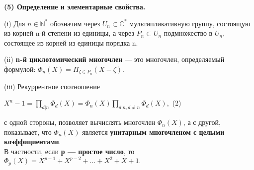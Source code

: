 \documentclass{mai_book}
\begin{document}
\textbf{(5) Определение и элементарные свойства.}

(i) Для $n \in \mathbb{N}^*$ обозначим через $U_n \subset \mathbb{C}^* $ мультипликативную 
группу,
состоящую из корней n-й степени из единицы, а через $P_n \subset U_n $
подмножество в $U_n$, состоящее из корней из единицы порядка n.

(ii) \textbf{n-й циклотомический многочлен} — это многочлен, 
определяемый формулой: $\Phi_n(X) = \Pi_{\zeta \in P_n}(X - \zeta). $

(iii) Рекуррентное соотношение \ 

\vspace{0pt}\hspace{100pt} $X^n - 1 = \prod\limits_{d|n}\Phi_d(X) = \Phi_n(X) \prod\limits_{d|n, d \neq n} \Phi_d(X),$  \hspace{50pt}(2)
 
 с одной стороны, позволяет вычислять многочлен $\Phi_n(X)$, а с другой,
показывает, что $\Phi_n(X)$ является \textbf{унитарным многочленом с целыми коэффициентами}.\\
В частности, если \textbf{р — простое число}, то
$\Phi_p(X) = X^{p-1} + X^{p-2}+...+X^2 +X +1.$ 
\end{document}
